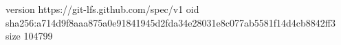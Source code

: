version https://git-lfs.github.com/spec/v1
oid sha256:a714d9f8aaa875a0e91841945d2fda34e28031e8c077ab5581f14d4cb8842ff3
size 104799
